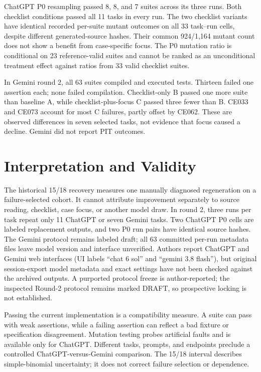 \documentclass[conference]{IEEEtran}
\begin{document}
ChatGPT P0 resampling passed 8, 8, and 7 suites across its three runs. Both checklist conditions passed all 11 tasks in every run. The two checklist variants have identical recorded per-suite mutant outcomes on all 33 task--run cells, despite different generated-source hashes. Their common 924/1,164 mutant count does not show a benefit from case-specific focus. The P0 mutation ratio is conditional on 23 reference-valid suites and cannot be ranked as an unconditional treatment effect against ratios from 33 valid checklist suites.

In Gemini round 2, all 63 suites compiled and executed tests. Thirteen failed one assertion each; none failed compilation. Checklist-only B passed one more suite than baseline A, while checklist-plus-focus C passed three fewer than B. CE033 and CE073 account for most C failures, partly offset by CE062. These are observed differences in seven selected tasks, not evidence that focus caused a decline. Gemini did not report PIT outcomes.
\section{Interpretation and Validity}
The historical 15/18 recovery measures one manually diagnosed regeneration on a failure-selected cohort. It cannot attribute improvement separately to source reading, checklist, case focus, or another model draw. In round 2, three runs per task repeat only 11 ChatGPT or seven Gemini tasks. Two ChatGPT P0 cells are labeled replacement outputs, and two P0 run pairs have identical source hashes. The Gemini protocol remains labeled draft; all 63 committed per-run metadata files leave model version and interface unverified. Authors report ChatGPT and Gemini web interfaces (UI labels ``chat 6 sol'' and ``gemini 3.8 flash''), but original session-export model metadata and exact settings have not been checked against the archived outputs. A purported protocol freeze is author-reported; the inspected Round-2 protocol remains marked DRAFT, so prospective locking is not established.

Passing the current implementation is a compatibility measure. A suite can pass with weak assertions, while a failing assertion can reflect a bad fixture or specification disagreement. Mutation testing probes artificial faults and is available only for ChatGPT. Different tasks, prompts, and endpoints preclude a controlled ChatGPT-versus-Gemini comparison. The 15/18 interval describes simple-binomial uncertainty; it does not correct failure selection or dependence.
\end{document}
